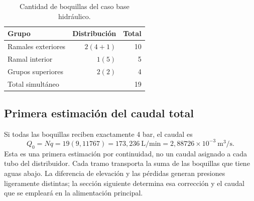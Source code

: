 \begin{table}[htbp]
\centering\small
\caption{Cantidad de boquillas del caso base hidráulico.}
\label{tab:man-asp-cantidad}
\begin{tabularx}{\linewidth}{@{}Xrr@{}}
\toprule Grupo & Distribución & Total\\\midrule
Ramales exteriores & $2(4+1)$ & 10\\
Ramal interior & $1(5)$ & 5\\
Grupos superiores & $2(2)$ & 4\\\midrule
Total simultáneo & & 19\\\bottomrule
\end{tabularx}
\end{table}

\subsection{Primera estimación del caudal total}
\label{sec:man-asp-qtotal}
Si todas las boquillas reciben exactamente 4 bar, el caudal es
\begin{equation}
 Q_0=Nq=19(9{,}11767)
 =173{,}236\ \mathrm{L/min}
 =2{,}88726\times10^{-3}\ \mathrm{m^3/s}.
 \label{eq:man-asp-q0}
\end{equation}
Esta es una primera estimación por continuidad, no un caudal asignado a
cada tubo del distribuidor. Cada tramo transporta la suma de las boquillas
que tiene aguas abajo. La diferencia de elevación y las pérdidas generan
presiones ligeramente distintas; la sección siguiente determina esa
corrección y el caudal que se empleará en la alimentación principal.